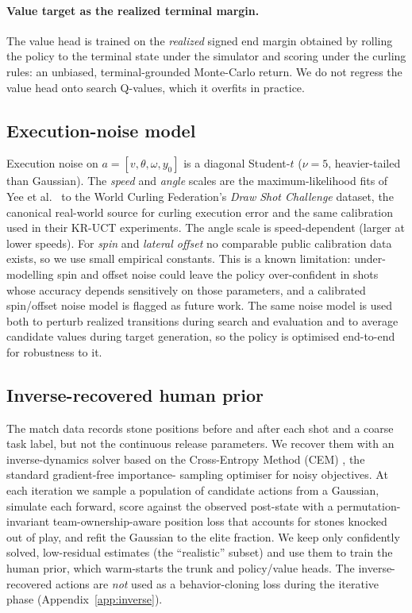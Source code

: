 \documentclass[11pt]{article}
\begin{document}
\paragraph{Value target as the realized terminal margin.}
The value head is trained on the \emph{realized} signed end margin obtained
by rolling the policy to the terminal state under the simulator and scoring
under the curling rules: an unbiased, terminal-grounded Monte-Carlo return.
We do not regress the value head onto search Q-values, which it overfits in
practice.

\subsection{Execution-noise model}
\label{sec:noise}
Execution noise on $a=[v,\theta,\omega,y_0]$ is a diagonal Student-$t$
($\nu=5$, heavier-tailed than Gaussian). The \emph{speed} and \emph{angle}
scales are the maximum-likelihood fits of Yee et al.~\cite{yee2016monte}
to the World Curling Federation's \emph{Draw Shot Challenge} dataset,
the canonical real-world source for curling execution error and the same
calibration used in their KR-UCT experiments. The angle scale is
speed-dependent (larger at lower speeds). For \emph{spin} and \emph{lateral
offset} no comparable public calibration data exists, so we use small
empirical constants. This is a known limitation: under-modelling spin and
offset noise could leave the policy over-confident in shots whose accuracy
depends sensitively on those parameters, and a calibrated spin/offset noise
model is flagged as future work. The same noise model is used both to
perturb realized transitions during search and evaluation and to average
candidate values during target generation, so the policy is optimised
end-to-end for robustness to it.

\subsection{Inverse-recovered human prior}
\label{sec:inverse}
The match data records stone positions before and after each shot and a
coarse task label, but not the continuous release parameters. We recover
them with an inverse-dynamics solver based on the Cross-Entropy Method
(CEM) \cite{deboer2005tutorial}, the standard gradient-free importance-
sampling optimiser for noisy objectives. At each iteration we sample a
population of candidate actions from a Gaussian, simulate each forward,
score against the observed post-state with a permutation-invariant
team-ownership-aware position loss that accounts for stones knocked out of
play, and refit the Gaussian to the elite fraction. We keep only confidently
solved, low-residual estimates (the ``realistic'' subset) and use them to
train the human prior, which warm-starts the trunk and policy/value heads.
The inverse-recovered actions are \emph{not} used as a behavior-cloning loss
during the iterative phase (Appendix~\ref{app:inverse}).
\end{document}
